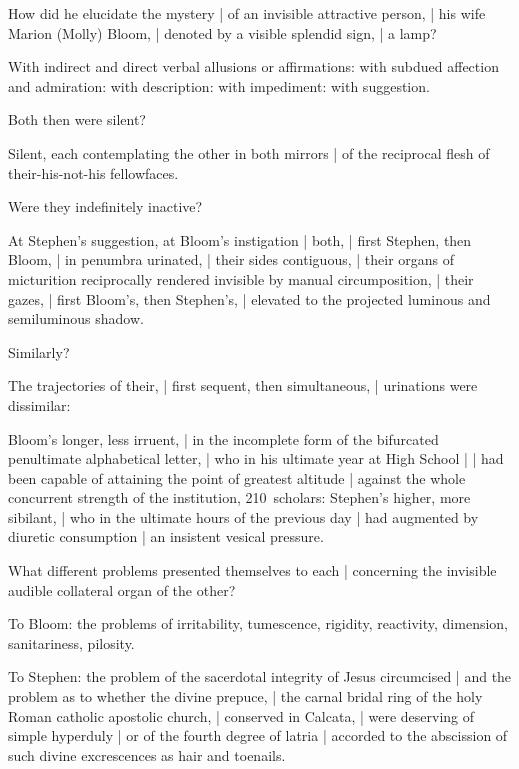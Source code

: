How did he elucidate the mystery |
of an invisible attractive person, |
his wife Marion (Molly) Bloom, |
denoted by a visible splendid sign, |
a lamp?

\Poetry
With indirect and direct verbal allusions or affirmations:
with subdued affection and admiration:
with description:
with impediment:
with suggestion.



Both then were silent?

\Poetry
Silent, each contemplating the other in both mirrors |
of the reciprocal flesh of their-his-not-his fellowfaces.



Were they indefinitely inactive?

\Science
At Stephen's suggestion,
at Bloom's instigation |
both, |
first Stephen, then Bloom, |
in penumbra urinated, |
their sides contiguous, |
their organs of micturition reciprocally rendered invisible by manual circumposition, |
their gazes, |
first Bloom's, then Stephen's, |
elevated to the projected luminous and semiluminous shadow.%


Similarly?

\Science
The trajectories of their, |
first sequent, then simultaneous, |
urinations were dissimilar:

\Memories
Bloom's longer, less irruent, |
in the incomplete form of the bifurcated penultimate alphabetical letter, |
who in his ultimate year at High School
 | |
had been capable of attaining the point of greatest altitude |
against the whole concurrent strength of the institution,
210~scholars:
Stephen's higher, more sibilant, |
who in the ultimate hours of the previous day |
had augmented by diuretic consumption |
an insistent vesical pressure.


What different problems presented themselves to each |
concerning the invisible audible collateral organ of the other?%

\Science
To Bloom:
the problems of irritability, tumescence, rigidity,
reactivity, dimension, sanitariness, pilosity.

\Religious
To Stephen:
the problem of the sacerdotal integrity of Jesus circumcised |
and the problem as to whether the divine prepuce, |
the carnal bridal ring of the holy Roman catholic apostolic church, |
conserved in Calcata, |
were deserving of simple hyperduly |
or of the fourth degree of latria |
accorded to the abscission of such divine excrescences as hair and toenails.


